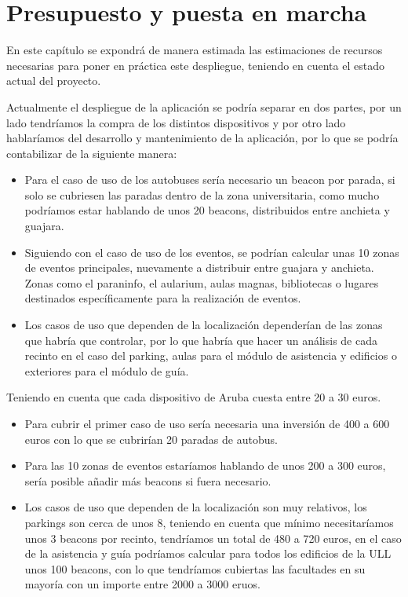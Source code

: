 %
%
%

\chapter{Presupuesto y puesta en marcha} \label{chap:presupuesto} 

En este capítulo se expondrá de manera estimada las estimaciones de recursos necesarias para poner en práctica este despliegue, teniendo en cuenta el estado actual del proyecto. 

Actualmente el despliegue de la aplicación se podría separar en dos partes, por un lado tendríamos la compra de los distintos dispositivos y por otro lado hablaríamos del desarrollo y mantenimiento de la aplicación, por lo que se podría contabilizar de la siguiente manera: 

\begin{itemize}
\item Para el caso de uso de los autobuses sería necesario un beacon por parada, si solo se cubriesen las paradas dentro de la zona universitaria, como mucho podríamos estar hablando de unos 20 beacons, distribuidos entre anchieta y guajara.
\item Siguiendo con el caso de uso de los eventos, se podrían calcular unas 10 zonas de eventos principales, nuevamente a distribuir entre guajara y anchieta. Zonas como el paraninfo, el aularium, aulas magnas, bibliotecas o lugares destinados específicamente para la realización de eventos.
\item Los casos de uso que dependen de la localización dependerían de las zonas que habría que controlar, por lo que habría que hacer un análisis de cada recinto en  el caso del parking, aulas para el módulo de asistencia y edificios o exteriores para el módulo de guía.
\end{itemize}


Teniendo en cuenta que cada dispositivo de Aruba cuesta entre 20 a 30 euros.

 
\begin{itemize}
\item Para cubrir el primer caso de uso sería necesaria una inversión de 400 a 600 euros con lo que se cubrirían 20 paradas de autobus.
\item Para las 10 zonas de eventos estaríamos hablando de unos 200 a 300 euros, sería posible añadir más beacons si fuera necesario.
\item Los casos de uso que dependen de la localización son muy relativos, los parkings son cerca de unos 8, teniendo en cuenta que mínimo necesitaríamos unos 3 beacons por recinto, tendríamos un total de 480 a 720 euros, en el caso de la asistencia y guía podríamos calcular para todos los edificios de la ULL unos 100 beacons, con lo que tendríamos cubiertas las facultades en su mayoría con un importe entre 2000 a 3000 eruos.
\end{itemize}


